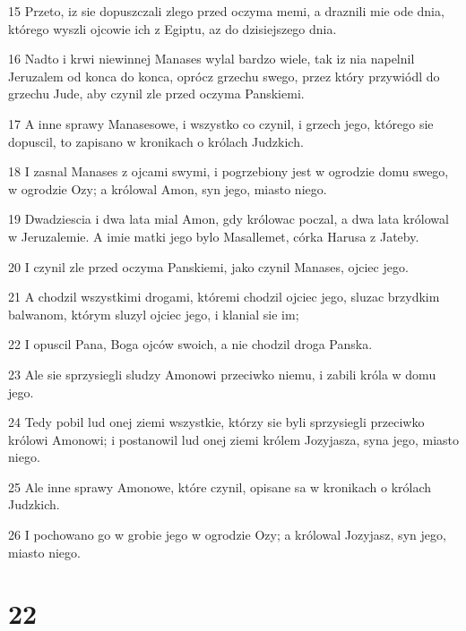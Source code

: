 \par 15 Przeto, iz sie dopuszczali zlego przed oczyma memi, a draznili mie ode dnia, którego wyszli ojcowie ich z Egiptu, az do dzisiejszego dnia.
\par 16 Nadto i krwi niewinnej Manases wylal bardzo wiele, tak iz nia napelnil Jeruzalem od konca do konca, oprócz grzechu swego, przez który przywiódl do grzechu Jude, aby czynil zle przed oczyma Panskiemi.
\par 17 A inne sprawy Manasesowe, i wszystko co czynil, i grzech jego, którego sie dopuscil, to zapisano w kronikach o królach Judzkich.
\par 18 I zasnal Manases z ojcami swymi, i pogrzebiony jest w ogrodzie domu swego, w ogrodzie Ozy; a królowal Amon, syn jego, miasto niego.
\par 19 Dwadziescia i dwa lata mial Amon, gdy królowac poczal, a dwa lata królowal w Jeruzalemie. A imie matki jego bylo Masallemet, córka Harusa z Jateby.
\par 20 I czynil zle przed oczyma Panskiemi, jako czynil Manases, ojciec jego.
\par 21 A chodzil wszystkimi drogami, któremi chodzil ojciec jego, sluzac brzydkim balwanom, którym sluzyl ojciec jego, i klanial sie im;
\par 22 I opuscil Pana, Boga ojców swoich, a nie chodzil droga Panska.
\par 23 Ale sie sprzysiegli sludzy Amonowi przeciwko niemu, i zabili króla w domu jego.
\par 24 Tedy pobil lud onej ziemi wszystkie, którzy sie byli sprzysiegli przeciwko królowi Amonowi; i postanowil lud onej ziemi królem Jozyjasza, syna jego, miasto niego.
\par 25 Ale inne sprawy Amonowe, które czynil, opisane sa w kronikach o królach Judzkich.
\par 26 I pochowano go w grobie jego w ogrodzie Ozy; a królowal Jozyjasz, syn jego, miasto niego.

\chapter{22}

